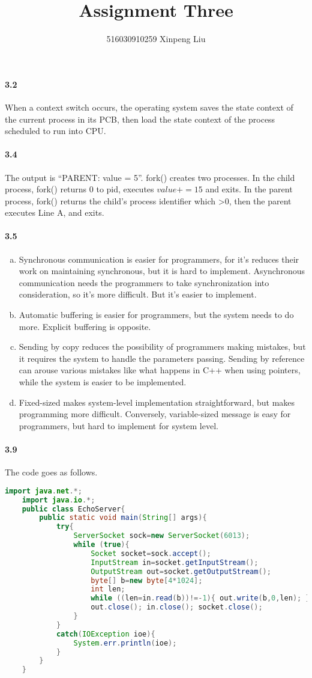 \documentclass[11pt,a4]{article}
\date{}
\author{516030910259   Xinpeng Liu}
\title{
	Assignment Three
}
\begin{document}
    \maketitle
	\paragraph{3.2} 
	When a context switch occurs, the operating system saves the state context of the current process in its PCB, then load the state context of the process scheduled to run into CPU.
	\paragraph{3.4}
	The output is ``PARENT: value = 5''.
	fork() creates two processes. In the child process, fork() returns 0 to pid, executes $value += 15$ and exits. In the parent process, fork() returns the child's process identifier which >0, then the parent executes Line A, and exits.
	\paragraph{3.5}
		\begin{enumerate}[a.]
		\item Synchronous communication is easier for programmers, for it's reduces their work on maintaining synchronous, but it is hard to implement. Asynchronous communication needs the programmers to take synchronization into consideration, so it's more difficult. But it's easier to implement.
		\item Automatic buffering is easier for programmers, but the system needs to do more. Explicit buffering is opposite.
		\item Sending by copy reduces the possibility of programmers making mistakes, but it requires the system to handle the parameters passing. Sending by reference can arouse various mistakes like what happens in C++ when using pointers, while the system is easier to be implemented.
		\item Fixed-sized makes system-level implementation straightforward, but makes programming more difficult. Conversely, variable-sized message is easy for programmers, but hard to implement for system level.
		\end{enumerate}
	\paragraph{3.9}
		The code goes as follows.
		\lstset{basicstyle=\footnotesize, numbers=left, breaklines=true, tabsize=2}
		\begin{lstlisting}[language=java]
	import java.net.*;
	import java.io.*;
	public class EchoServer{
		public static void main(String[] args){
			try{
				ServerSocket sock=new ServerSocket(6013);
				while (true){
					Socket socket=sock.accept();
					InputStream in=socket.getInputStream();
					OutputStream out=socket.getOutputStream();
					byte[] b=new byte[4*1024];
					int len;
					while ((len=in.read(b))!=-1){ out.write(b,0,len); }
					out.close(); in.close(); socket.close();
				}
			}
			catch(IOException ioe){
				System.err.println(ioe);
			}
		}
	}
		\end{lstlisting}
	
	
\end{document}
